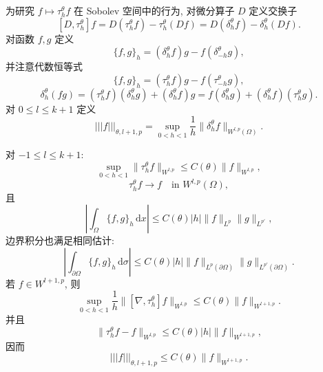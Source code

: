 为研究 $f\mapsto\tau_h^\theta f$ 在 Sobolev 空间中的行为, 对微分算子 $D$ 定义交换子
\[
 [D,\tau_h^\theta]f=D(\tau_h^\theta f)-\tau_h^\theta(Df)
 =D(\delta_h^\theta f)-\delta_h^\theta(Df).
\]
对函数 $f,g$ 定义
\begin{equation}
 \{f,g\}_h=(\delta_h^\theta f)g-f(\delta_{-h}^\theta g),
 \label{eq:chap3-curved-translation-commutator}
\end{equation}
并注意代数恒等式
\[
 \{f,g\}_h=(\tau_h^\theta f)g-f(\tau_{-h}^\theta g),
\]
\[
 \delta_h^\theta(fg)=(\tau_h^\theta f)(\delta_h^\theta g)+(\delta_h^\theta f)g
 =f(\delta_h^\theta g)+(\delta_h^\theta f)(\tau_h^\theta g).
\]
对 $0\leq l\leq k+1$ 定义
\[
 |||f|||_{\theta,l+1,p}
 =\sup_{0<h<1}\frac1h\|\delta_h^\theta f\|_{W^{l,p}(\Omega)}.
\]

\begin{Proposition}
\label{prop:chap3-curved-translation-properties}
对 $-1\leq l\leq k+1$:
\begin{equation}
 \sup_{0<h<1}\|\tau_h^\theta f\|_{W^{l,p}}
 \leq C(\theta)\|f\|_{W^{l,p}},
 \label{eq:chap3-curved-translation-uniform-bound}
\end{equation}
\begin{equation}
 \tau_h^\theta f\longrightarrow f\quad\text{in }W^{l,p}(\Omega),
 \label{eq:chap3-curved-translation-convergence}
\end{equation}
且
\begin{equation}
 \left|\int_\Omega\{f,g\}_h\,\mathrm dx\right|
 \leq C(\theta)|h|\|f\|_{L^p}\|g\|_{L^{p'}},
 \label{eq:chap3-curved-translation-duality-volume}
\end{equation}
边界积分也满足相同估计:
\begin{equation}
 \left|\int_{\partial\Omega}\{f,g\}_h\,\mathrm d\sigma\right|
 \leq C(\theta)|h|\|f\|_{L^p(\partial\Omega)}\|g\|_{L^{p'}(\partial\Omega)}.
 \label{eq:chap3-curved-translation-duality-boundary}
\end{equation}
若 $f\in W^{l+1,p}$, 则
\begin{equation}
 \sup_{0<h<1}\frac1h
 \|[\nabla,\tau_h^\theta]f\|_{W^{l,p}}
 \leq C(\theta)\|f\|_{W^{l+1,p}}.
 \label{eq:chap3-curved-translation-gradient-commutator}
\end{equation}
并且
\[
 \|\tau_h^\theta f-f\|_{W^{l,p}}\leq C(\theta)|h|\|f\|_{W^{l+1,p}},
\]
因而
\begin{equation}
 |||f|||_{\theta,l+1,p}\leq C(\theta)\|f\|_{W^{l+1,p}}.
 \label{eq:chap3-curved-translation-seminorm-bound}
\end{equation}
\end{Proposition}

